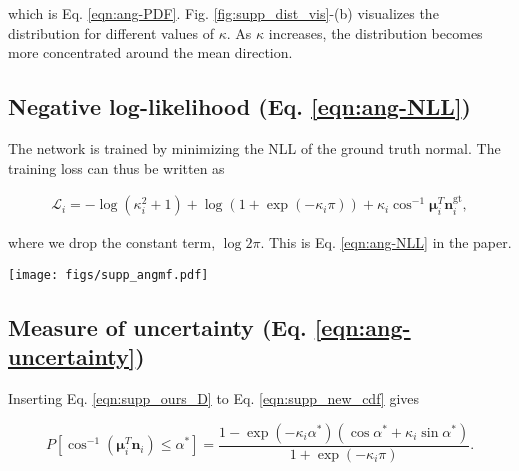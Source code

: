 \documentclass[10pt,twocolumn,letterpaper]{article}
\begin{document}
\noindent
which is Eq. \ref{eqn:ang-PDF}. Fig. \ref{fig:supp_dist_vis}-(b) visualizes the distribution for different values of $\kappa$. As $\kappa$ increases, the distribution becomes more concentrated around the mean direction. 

\subsection{Negative log-likelihood (Eq. \ref{eqn:ang-NLL})}

The network is trained by minimizing the NLL of the ground truth normal. The training loss can thus be written as

\begin{equation}
\begin{aligned}
\label{eqn:supp_new_nll2}
\mathcal{L}_i = - \log (\kappa_i^2 + 1)
+ \log (1 + \exp(-\kappa_i \pi))
+ \kappa_i \cos^{-1} \boldsymbol{\mu}_i^T \mathbf{n}^\text{gt}_i,
\end{aligned}
\end{equation}

\noindent
where we drop the constant term, $\log 2\pi$. This is Eq. \ref{eqn:ang-NLL} in the paper.

\begin{figure*}[t]
\begin{center}
\texttt{[image: figs/supp\_angmf.pdf]}
\end{center}
\caption{(a) The axes orientation used for the integrations in Eq. \ref{eqn:supp_new_cdf} and Eq. \ref{eqn:supp_exp_error}. The mean direction $\boldsymbol{\mu}$ is aligned with the $z$-axis, and is thus excluded in the integration. (b) Visualization of Eq. \ref{eqn:supp_new_pdf2} for different values of $\kappa$. $\kappa$ determines how concentrated the distribution is towards the mean direction. (c) Eq. \ref{eqn:supp_ours_cdf2}, Eq. \ref{eqn:supp_alpha_pdf} and Eq. \ref{eqn:supp_exp_error} plotted for different values of $\kappa$. The expected error decreases as the confidence $\kappa$ increases.}
\label{fig:supp_dist_vis}
\end{figure*}

\subsection{Measure of uncertainty (Eq. \ref{eqn:ang-uncertainty})}

Inserting Eq. \ref{eqn:supp_ours_D} to Eq. \ref{eqn:supp_new_cdf} gives

\begin{equation}
\label{eqn:supp_ours_cdf2}
P[\cos^{-1} (\boldsymbol{\mu}_i^T \mathbf{n}_i) \leq \alpha^*]
= 
\frac{1 - \exp(-\kappa_i \alpha^*) (\cos \alpha^* + \kappa_i \sin \alpha^*)}{1 + \exp(-\kappa_i \pi)}.
\end{equation}
\end{document}
